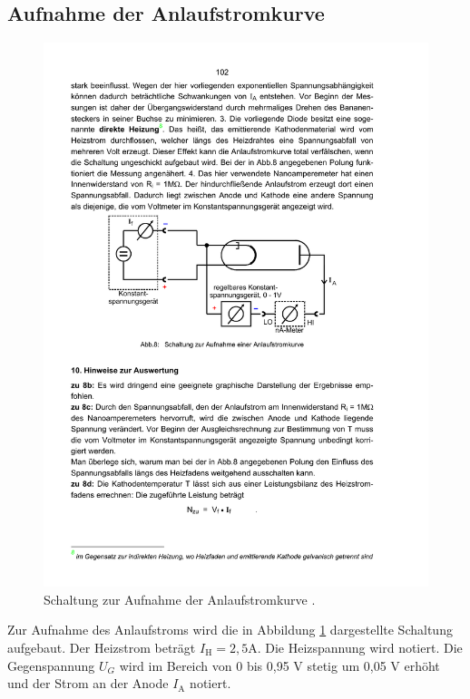 \subsection{Aufnahme der Anlaufstromkurve}

\begin{figure}
  \centering
  \includegraphics[scale=0.6]{content/aufbau2.pdf}
\caption{Schaltung zur Aufnahme der Anlaufstromkurve \cite{anleitung504}.}
  \label{fig:aufbau2}
\end{figure}

Zur Aufnahme des Anlaufstroms wird die in Abbildung \ref{fig:aufbau2} dargestellte Schaltung aufgebaut. Der Heizstrom beträgt $I_\mathrm{H} = 2,5 \si{\ampere}$. Die Heizspannung wird notiert. Die Gegenspannung $U_G$ wird im Bereich von 0 bis 0,95 \si{\volt} stetig um 0,05 \si{\volt} erhöht und der Strom an der Anode $I_\mathrm{A}$ notiert.
